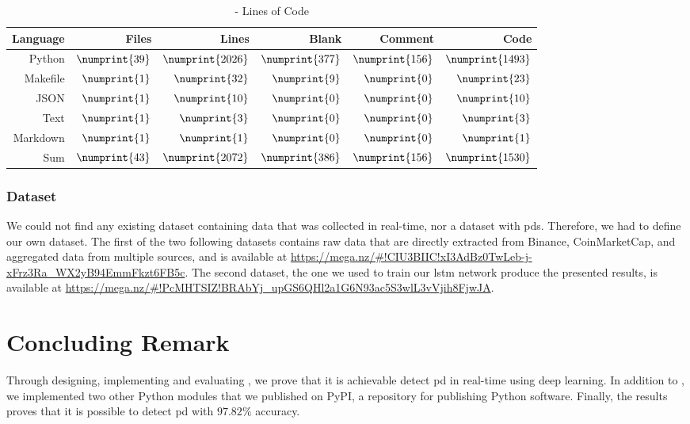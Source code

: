 \begin{table}[ht]
        \centering
        \begin{tabularx}{\textwidth}{ |R|R|R|R|R|R| }\hline
        Language    & Files             & Lines             & Blank             & Comment           & Code              \\\hline
        Python      & $\numprint{39}$   & $\numprint{2026}$ & $\numprint{377}$  & $\numprint{156}$  & $\numprint{1493}$ \\
        Makefile    & $\numprint{1}$    & $\numprint{32}$   & $\numprint{9}$    & $\numprint{0}$    & $\numprint{23}$   \\
        JSON        & $\numprint{1}$    & $\numprint{10}$   & $\numprint{0}$    & $\numprint{0}$    & $\numprint{10}$   \\
        Text        & $\numprint{1}$    & $\numprint{3}$    & $\numprint{0}$    & $\numprint{0}$    & $\numprint{3}$    \\
        Markdown    & $\numprint{1}$    & $\numprint{1}$    & $\numprint{0}$    & $\numprint{0}$    & $\numprint{1}$    \\\hline
        Sum         & $\numprint{43}$   & $\numprint{2072}$ & $\numprint{386}$  & $\numprint{156}$  & $\numprint{1530}$ \\\hline
        \end{tabularx}
        \caption{\project - Lines of Code}
        \label{tab:cloc_thesis}
\end{table}

\subsubsection{Dataset}
We could not find any existing dataset containing data that was collected in real-time, nor a dataset with \acp{pd}. Therefore, we had to define our own dataset. The first of the two following datasets contains raw data that are directly extracted from Binance, CoinMarketCap, and aggregated data from multiple sources, and is available at \url{https://mega.nz/#!CIU3BIIC!xI3AdBz0TwLeb-j-xFrz3Ra_WX2yB94EmmFkzt6FB5c}. The second dataset, the one we used to train our \ac{lstm} network produce the presented results, is available at \url{https://mega.nz/#!PcMHTSIZ!BRAbYj_upGS6QHl2a1G6N93ac5S3wlL3vVjih8FjwJA}.

\section{Concluding Remark}
Through designing, implementing and evaluating \project, we prove that it is achievable detect \ac{pd} in real-time using deep learning. In addition to \project, we implemented two other Python modules that we published on PyPI, a repository for publishing Python software. Finally, the results proves that it is possible to detect \ac{pd} with $97.82\%$ accuracy.

